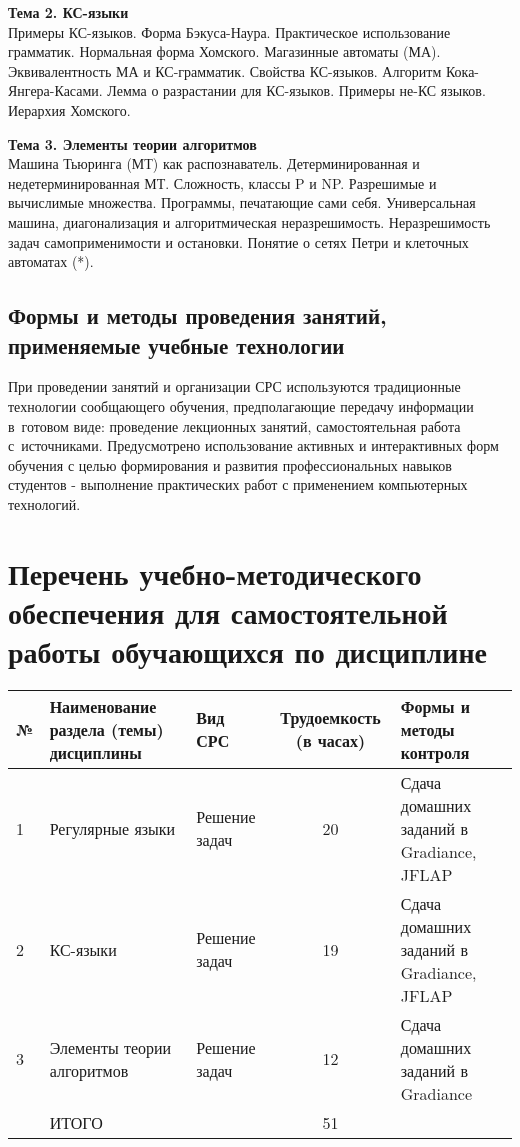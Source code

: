 \documentclass[a4paper,12pt]{article}
\begin{document}
\textbf{Тема 2. КС-языки        }\\
Примеры КС-языков. Форма Бэкуса-Наура. Практическое использование грамматик. Нормальная форма Хомского. Магазинные автоматы (МА). Эквивалентность МА и КС-грамматик. Свойства КС-языков. Алгоритм Кока-Янгера-Касами. Лемма о разрастании для КС-языков. Примеры не-КС языков. Иерархия Хомского.

\textbf{Тема 3. Элементы теории алгоритмов	   }\\
Машина Тьюринга (МТ) как распознаватель. Детерминированная и недетерминированная МТ. Сложность, классы P и NP. Разрешимые и вычислимые множества. Программы, печатающие сами себя. Универсальная машина, диагонализация и алгоритмическая неразрешимость. Неразрешимость задач самоприменимости и остановки. Понятие о сетях Петри и клеточных автоматах (*).
 

\subsection{Формы и методы проведения занятий, применяемые учебные технологии}
При проведении занятий и организации СРС используются традиционные технологии сообщающего обучения, предполагающие передачу информации в~готовом виде: проведение лекционных занятий, самостоятельная работа с~источниками. Предусмотрено использование активных и интерактивных форм обучения с целью формирования и развития профессиональных навыков студентов - выполнение практических работ с применением компьютерных технологий. 



\section{Перечень учебно-методического обеспечения для самостоятельной работы обучающихся по дисциплине}
\begin{longtable}{|l|>{\raggedright\arraybackslash}p{40mm}|>{\raggedright\arraybackslash}p{54mm}|c|>{\raggedright\arraybackslash}p{30mm}|}
\hline
№ & \centering Наименование раздела (темы) дисциплины & 
\centering Вид СРС & \multicolumn{1}{p{14mm}|}{\centering Трудо\-емкость (в часах)} & \centering\arraybackslash Формы и методы контроля\\
\hline
1 & Регулярные языки	               & Решение задач  & 20 & Сдача домашних заданий в Gradiance, JFLAP \\ 
\hline
2 & КС-языки						   & Решение задач  & 19 & Сдача домашних заданий в Gradiance, JFLAP \\ 
\hline
3 & Элементы теории алгоритмов  & Решение задач  & 12 & Сдача домашних заданий в Gradiance \\ 
\hline
 & ИТОГО                           &                & 51 &  \\ 

\hline
\end{longtable}
\end{document}
